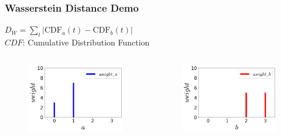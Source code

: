 \documentclass{beamer}
\begin{document}


\begin{frame}
\frametitle{Wasserstein Distance Demo}
\setlength{\abovecaptionskip}{-2mm}
\setlength{\belowcaptionskip}{0mm}
$D_{W}=\sum_t|\mathrm{CDF}_a(t) - \mathrm{CDF}_b(t)|$ \\
$CDF$: Cumulative Distribution Function
\begin{columns}
\begin{figure}
    \centering
    \includegraphics[width=1.0\linewidth]{img/a.png}
\end{figure}
\vspace{-7mm}
\begin{figure}
    \centering
    \includegraphics[width=1.0\linewidth]{img/b.png}
\end{figure}

\end{columns}
\end{frame}
\end{document}
